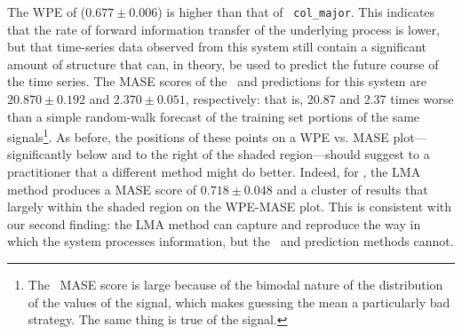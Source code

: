 The WPE of \svdfive ($0.677 \pm 0.006$) is higher than that of {\tt
  col\_major}.  This indicates that the rate of forward information
transfer of the underlying process is lower, but that time-series data
observed from this system still contain a significant amount of
structure that can, in theory, be used to predict the future course of
the time series.
The MASE scores of the \naive ~and \arima predictions for this system
are $20.870 \pm 0.192$ and $2.370 \pm 0.051$, respectively: that is,
20.87 and 2.37 times worse than a simple random-walk forecast of the
training set portions of the same signals\footnote{The \naive ~MASE
  score is large because of the bimodal nature of the distribution of
  the values of the signal, which makes guessing the mean a
  particularly bad strategy.  The same thing is true of the \svdthree
  signal.}.  As before, the positions of these points on a WPE
vs. MASE plot---significantly below and to the right of the shaded
region---should suggest to a practitioner that
a different method might do better.  Indeed, for \svdfive, the LMA
method produces a MASE score of $ 0.718\pm 0.048 $ and a cluster of
results that largely within the shaded region on the WPE-MASE plot.
This is consistent with our second finding: the LMA method can capture
and reproduce the way in which the \svdfive system processes
information, but the \naive ~and \arima prediction methods cannot.

